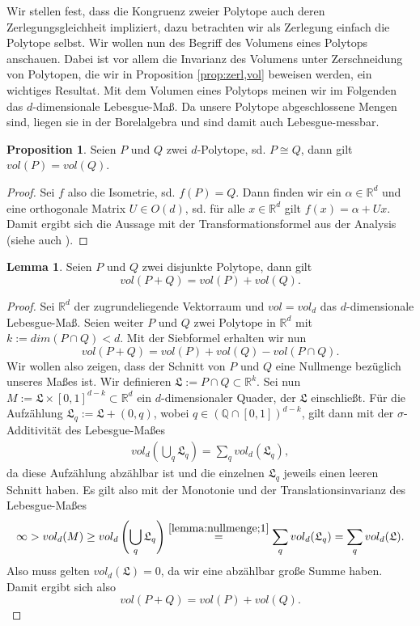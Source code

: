 \documentclass[11pt,titlepage]{article}
\newcommand{\setQ}{\mathbb{Q}}
\newcommand{\setR}{\mathbb{R}}
\theoremstyle{definition}
\newtheorem{proposition}[theorem]{Proposition}
\newtheorem{lemma}[theorem]{Lemma}
\theoremstyle{remark}
\begin{document}
	Wir stellen fest, dass die Kongruenz zweier Polytope auch deren 
	Zerlegungsgleichheit impliziert, dazu betrachten wir als Zerlegung einfach 
	die Polytope selbst. Wir wollen nun des Begriff des Volumens eines Polytops anschauen. Dabei ist 
	vor allem die Invarianz des Volumens unter Zerschneidung von Polytopen, die wir in Proposition \ref{prop:zerl,vol} beweisen werden, ein wichtiges Resultat. Mit dem Volumen eines Polytops meinen wir im Folgenden das 
	$d$-dimensionale Lebesgue-Maß. Da unsere Polytope abgeschlossene Mengen 
	sind, liegen sie in der Borelalgebra und sind damit auch Lebesgue-messbar.
	
	\begin{proposition} \label{prop:cong,vol}
		Seien $P$ und $Q$ zwei $d$-Polytope, sd. $P\cong Q$, dann gilt $vol(P)=vol(Q)$.
	\end{proposition}
	
	\begin{proof}
		Sei $f$ also die Isometrie, sd. $f(P)=Q$. Dann finden wir ein 
		$\alpha\in\setR^d$ und eine orthogonale Matrix $U\in O(d)$, sd. für 
		alle $x\in\setR^d$ gilt $f(x)=\alpha+Ux$. Damit ergibt sich die Aussage 
		mit der Transformationsformel 
		aus der Analysis (siehe auch \cite[Satz 4.7]{SkriptAna3}).
	\end{proof}
	
	\begin{lemma}\label{lemma:nullmenge}
		Seien $P$ und $Q$ zwei disjunkte Polytope, dann gilt
		\[ vol(P+Q)=vol(P)+vol(Q).\]
	\end{lemma}

	\begin{proof}
		Sei $\setR^d$ der zugrundeliegende Vektorraum und $vol=vol_d$ das $d$-dimensionale 
		Lebesgue-Maß. Seien weiter $P$ und $Q$ zwei Polytope in $\setR^d$ 
		mit $k:=dim(P\cap Q)<d$. Mit der Siebformel erhalten wir nun
		\[vol(P+Q)=vol(P)+vol(Q)-vol(P\cap Q).\]
		Wir wollen also zeigen, dass der Schnitt von $P$ und $Q$ eine Nullmenge bezüglich unseres Maßes ist. 
		Wir definieren $\mathfrak{L}:=P\cap Q \subset \setR^k$. Sei nun  $M:=\mathfrak{L}\times[0,1]^{d-k}\subset\setR^d$ ein $d$-dimensionaler Quader, der 
		$\mathfrak{L}$ einschließt. Für die Aufzählung $\mathfrak{L}_q:=\mathfrak{L}+(0,q)$, wobei $q\in(\setQ\cap[0,1])^{d-k}$, gilt dann mit der $\sigma$-Additivität des Lebesgue-Maßes
		\begin{align}
			vol_d \left(\bigcup_q\mathfrak{L}_q\right)=\sum_q vol_d(\mathfrak{L}_q), \label{lemma:nullmenge;1}
		\end{align}
		da diese Aufzählung abzählbar ist und die einzelnen $\mathfrak{L}_q$ jeweils einen leeren Schnitt haben. Es gilt also mit der Monotonie und der Translationsinvarianz des Lebesgue-Maßes
		\[\infty>vol_d(M)\geq vol_d\left(\bigcup_q \mathfrak{L}_q\right)\overset{\ref{lemma:nullmenge;1}}{=}\sum_q vol_d(\mathfrak{L}_q)=\sum_q vol_d(\mathfrak{L}).\]
		Also muss gelten $vol_d(\mathfrak{L})=0$, da wir eine abzählbar große Summe haben. 
		Damit ergibt sich also
		\[vol(P+Q)=vol(P)+vol(Q).\]
	\end{proof}
\end{document}
